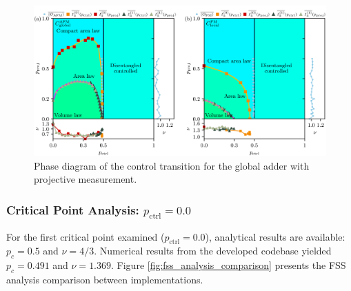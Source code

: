 \documentclass[11pt,a4paper]{article}
\begin{document}
\begin{figure}[H]
    \centering
    \includegraphics[width=0.8\linewidth]{pd.png}
    \caption{Phase diagram of the control transition for the global adder with projective measurement.}
    \label{fig:phase_diagram}
\end{figure}

\subsubsection{Critical Point Analysis: $p_\text{ctrl}=0.0$}

For the first critical point examined ($p_\text{ctrl}=0.0$), analytical results are available: $p_c=0.5$ and $\nu=4/3$. Numerical results from the developed codebase yielded $p_c=0.491$ and $\nu=1.369$. Figure \ref{fig:fss_analysis_comparison} presents the FSS analysis comparison between implementations.
\end{document}
